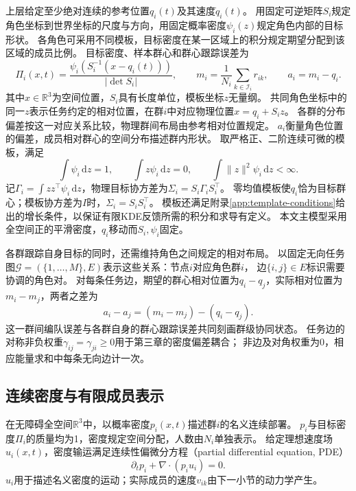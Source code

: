 \documentclass[UTF8,a4paper,11pt,fontset=none]{ctexart}
\newcommand{\R}{\mathbb R}\newcommand{\KL}{\operatorname{KL}}
\begin{document}
上层给定至少绝对连续的参考位置$q_i(t)$及其速度$\dot q_i(t)$。
用固定可逆矩阵$S_i$规定角色坐标到世界坐标的尺度与方向，用固定概率密度$\psi_i(z)$规定角色内部的目标形状。
各角色可采用不同模板，目标密度在某一区域上的积分规定期望分配到该区域的成员比例。
目标密度、样本群心和群心跟踪误差为
\begin{equation}
\Pi_i(x,t)=\frac{\psi_i(S_i^{-1}(x-q_i(t)))}{|\det S_i|},\qquad
m_i=\frac1{N_i}\sum_{k\in\mathcal I_i}r_{ik},\qquad a_i=m_i-q_i .
\label{eq:target}
\end{equation}
其中$x\in\R^3$为空间位置，$S_i$具有长度单位，模板坐标$z$无量纲。
共同角色坐标中的同一$z$表示任务约定的相对位置，在群$i$中对应物理位置$x=q_i+S_i z$。
各群的分布偏差按这一对应关系比较，物理群间布局由参考相对位置规定。
$a_i$衡量角色位置的偏差，成员相对群心的空间分布描述群内形状。
取严格正、二阶连续可微的模板，满足
\begin{equation}
\int\psi_i\,\mathrm dz=1,\qquad
\int z\psi_i\,\mathrm dz=0,\qquad
\int\|z\|^2\psi_i\,\mathrm dz<\infty .
\label{eq:template-moments}
\end{equation}
记$\Gamma_i=\int zz^\top\psi_i\,\mathrm dz$，物理目标协方差为$\Sigma_i=S_i\Gamma_iS_i^\top$。
零均值模板使$q_i$恰为目标群心；模板协方差为$I$时，$\Sigma_i=S_iS_i^\top$。
模板还满足附录\ref{app:template-conditions}给出的增长条件，以保证有限KDE反馈所需的积分和求导有定义。
本文主模型采用全空间正的平滑密度，$q_i$移动而$S_i,\psi_i$固定。

各群跟踪自身目标的同时，还需维持角色之间规定的相对布局。
以固定无向任务图$\mathcal G=(\{1,\ldots,M\},E)$表示这些关系：节点$i$对应角色群$i$，
边$\{i,j\}\in E$标识需要协调的角色对。
对每条任务边，期望的群心相对位置为$q_i-q_j$，实际相对位置为$m_i-m_j$，两者之差为
\[
a_i-a_j=(m_i-m_j)-(q_i-q_j).
\]
这一群间编队误差与各群自身的群心跟踪误差共同刻画群级协同状态。
任务边的对称非负权重$\gamma_{ij}=\gamma_{ji}\ge0$用于第三章的密度偏差耦合；
非边及对角权重为0，相应能量求和中每条无向边计一次。

\subsection{连续密度与有限成员表示}
在无障碍全空间$\R^3$中，以概率密度$p_i(x,t)$描述群$i$的名义连续部署。
$p_i$与目标密度$\Pi_i$的质量均为1，密度规定空间分配，人数由$N_i$单独表示。
给定理想速度场$u_i(x,t)$，密度输运满足连续性偏微分方程（partial differential equation, PDE）
\begin{equation}
\partial_t p_i+\nabla\cdot(p_i u_i)=0.
\label{eq:pde}
\end{equation}
$u_i$用于描述名义密度的运动；实际成员的速度$v_{ik}$由下一小节的动力学产生。
\end{document}
